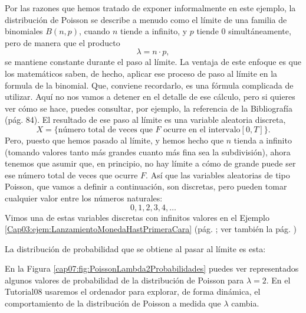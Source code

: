 Por las razones que hemos tratado de exponer informalmente en este ejemplo, la distribución de
Poisson se describe a menudo como el límite de una familia de binomiales $B(n,p)$, cuando $n$
tiende a infinito, y $p$ tiende $0$ simultáneamente, pero de manera que el producto
\[\lambda=n\cdot p,\]
se mantiene constante durante el paso al límite. La ventaja de este enfoque es que los matemáticos
saben, de hecho, aplicar ese proceso de paso al límite en la formula de la binomial. Que, conviene
recordarlo, es una fórmula complicada de utilizar. Aquí no nos vamos a detener en el detalle de ese
cálculo, pero si quieres ver cómo se hace, puedes consultar, por ejemplo, la referencia \cite{garcia2009estadistica} de la Bibliografía (pág. 84).
El resultado de ese paso al límite es una variable aleatoria discreta,
\[X=\{\mbox{número total de veces que $F$ ocurre en el intervalo}[0,T]\}.\]
Pero, puesto que hemos pasado al límite, y hemos hecho que $n$ tienda a infinito (tomando valores
tanto más grandes cuanto más fina sea la subdivisión), ahora tenemos que asumir que, en principio,
no hay límite a cómo de grande puede ser ese número total de veces que ocurre $F$. Así que las
variables aleatorias de tipo Poisson, que vamos a definir a continuación, son discretas, pero
pueden tomar cualquier valor entre los números naturales:
    \[0,1,2,3,4, \ldots\]
Vimos una de estas variables discretas con infinitos valores en el Ejemplo
\ref{Cap03:ejem:LanzamientoMonedaHastPrimeraCara} (pág.
\pageref{Cap03:ejem:LanzamientoMonedaHastPrimeraCara}; ver también la pág.
\pageref{cap04:tabla:tablaDensidadProbabilidadInfinita})

La distribución de probabilidad que se obtiene al pasar al límite es esta:
    \begin{center}
    \end{center}
En la Figura \ref{cap07:fig:PoissonLambda2Probabilidades} puedes ver representados algunos valores
de probabilidad de la distribución de Poisson para $\lambda=2$. En el Tutorial08 usaremos el ordenador para explorar, de forma dinámica, el comportamiento de la distribución de Poisson a medida que $\lambda$ cambia.

